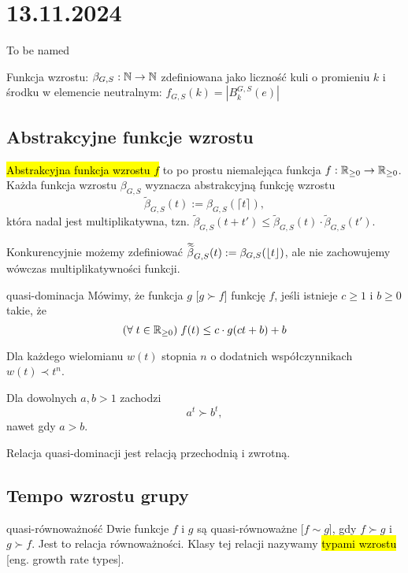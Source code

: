 \section{13.11.2024}{To be named}

Funkcja wzrostu: $\beta_{G, S}:\mathbb{N}\to\mathbb{N}$ zdefiniowana jako liczność kuli o promieniu $k$ i środku w elemencie neutralnym: $f_{G, S}(k)=|B_k^{G,S}(e)|$

\subsection{Abstrakcyjne funkcje wzrostu} %

\hl{Abstrakcyjna funkcja wzrostu $f$} to po prostu niemalejąca funkcja $f:\mathbb{R}_{\geq 0}\to \mathbb{R}_{\geq 0}$. Każda funkcja wzrostu $\beta_{G, S}$ wyznacza abstrakcyjną funkcję wzrostu 
$$\widetilde{\beta}_{G,S}(t):=\beta_{G,S}(\lceil t\rceil),$$
która nadal jest multiplikatywna, tzn. $\widetilde{\beta}_{G,S}(t+t')\leq \widetilde{\beta}_{G,S}(t)\cdot\widetilde{\beta}_{G,S}(t')$.

Konkurencyjnie możemy zdefiniować $\doublewidetilde{\beta}_{G,S}(t):=\beta_{G,S}(\lfloor t\rfloor)$, ale nie zachowujemy wówczas multiplikatywności funkcji.

\begin{definition}{quasi-dominacja}{}
  Mówimy, że funkcja $g$  [$g\succ f$] funkcję $f$, jeśli istnieje $c\geq1$ i $b\geq0$ takie, że
  $$(\forall\;t\in\mathbb{R}_{\geq0})\;f(t)\leq c\cdot g(ct+b)+b$$
\end{definition}

\begin{example}[m]
  \item Dla każdego wielomianu $w(t)$ stopnia $n$ o dodatnich współczynnikach $w(t)\prec t^n$.
  \item Dla dowolnych $a,b>1$ zachodzi 
    $$a^t\succ b^t,$$
    nawet gdy $a>b$.
\end{example}

Relacja quasi-dominacji jest relacją przechodnią i zwrotną.

\subsection{Tempo wzrostu grupy}

\begin{definition}{quasi-równoważność}{}
  Dwie funkcje $f$ i $g$ są quasi-równoważne [$f\sim g$], gdy $f\succ g$ i $g\succ f$. Jest to relacja równoważności. Klasy tej relacji nazywamy \hl{typami wzrostu} [eng. growth rate types].
\end{definition}

